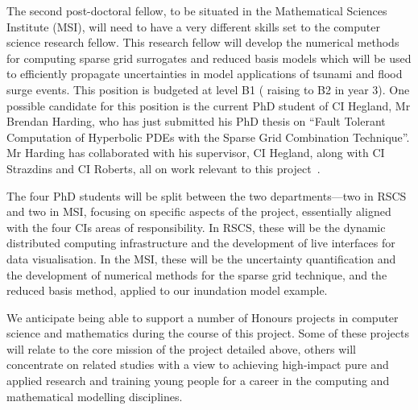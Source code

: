 The second post-doctoral fellow, to be
situated in the Mathematical Sciences Institute (MSI), 
will need to have a very different skills set to the computer 
science research fellow. This research fellow will develop
the numerical methods for computing sparse grid surrogates and reduced
basis models which will be used to efficiently propagate 
uncertainties in
model applications of tsunami and flood surge events. This 
position is budgeted at level B1 ( raising to B2 in year 3).
One possible candidate for this position is the current PhD 
student of CI Hegland, Mr Brendan Harding,  who has just 
submitted his PhD thesis on ``Fault Tolerant Computation of
Hyperbolic PDEs with the Sparse Grid Combination Technique''.
Mr Harding has collaborated with his supervisor, 
CI Hegland, along with CI Strazdins and CI Roberts, all
on work relevant to this project~\parencite{Ali11022016,AliEtal2015,deBaarHarding2015,
HardingHLS2015,StrazdinsEtal2015}.


The four PhD students will be split between the two departments---two
in RSCS and two in MSI, focusing on specific aspects of the project,
essentially aligned with the four CIs areas of responsibility.  In
RSCS, these will be the dynamic distributed computing infrastructure
and the development of live interfaces for data visualisation. In the
MSI, these will be the uncertainty quantification and the development
of numerical methods for the sparse grid technique, and the reduced
basis method, applied to our inundation model example.

We anticipate being able to support a number of Honours projects in
computer science and mathematics during the course of this
project. Some of these projects will relate to the core mission of the
project detailed above, others will concentrate on related studies
with a view to achieving high-impact pure and applied research and
training young people for a career in the computing and mathematical
modelling disciplines.

